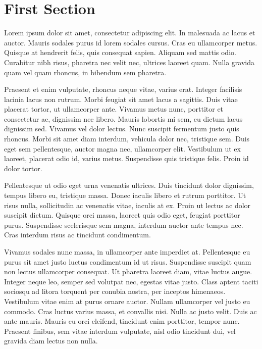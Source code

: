 \documentclass[10pt,
twocolumn,a4paper]{article}
\begin{document}
\section{First Section}


Lorem ipsum dolor sit amet, consectetur adipiscing elit. In malesuada ac lacus et auctor. Mauris sodales purus id lorem sodales cursus. Cras eu ullamcorper metus. Quisque at hendrerit felis, quis consequat sapien. Aliquam sed mattis odio. Curabitur nibh risus, pharetra nec velit nec, ultrices laoreet quam. Nulla gravida quam vel quam rhoncus, in bibendum sem pharetra.

Praesent et enim vulputate, rhoncus neque vitae, varius erat. Integer facilisis lacinia lacus non rutrum. Morbi feugiat sit amet lacus a sagittis. Duis vitae placerat tortor, ut ullamcorper ante. Vivamus metus nunc, porttitor et consectetur ac, dignissim nec libero. Mauris lobortis mi sem, eu dictum lacus dignissim sed. Vivamus vel dolor lectus. Nunc suscipit fermentum justo quis rhoncus. Morbi sit amet diam interdum, vehicula dolor nec, tristique sem. Duis eget sem pellentesque, auctor magna nec, ullamcorper elit. Vestibulum ut ex laoreet, placerat odio id, varius metus. Suspendisse quis tristique felis. Proin id dolor tortor.

Pellentesque ut odio eget urna venenatis ultrices. Duis tincidunt dolor dignissim, tempus libero eu, tristique massa. Donec iaculis libero et rutrum porttitor. Ut risus nulla, sollicitudin ac venenatis vitae, iaculis at ex. Proin ut lectus ac dolor suscipit dictum. Quisque orci massa, laoreet quis odio eget, feugiat porttitor purus. Suspendisse scelerisque sem magna, interdum auctor ante tempus nec. Cras interdum risus ac tincidunt condimentum.

Vivamus sodales nunc massa, in ullamcorper ante imperdiet at. Pellentesque eu purus sit amet justo luctus condimentum id ut risus. Suspendisse suscipit quam non lectus ullamcorper consequat. Ut pharetra laoreet diam, vitae luctus augue. Integer neque leo, semper sed volutpat nec, egestas vitae justo. Class aptent taciti sociosqu ad litora torquent per conubia nostra, per inceptos himenaeos. Vestibulum vitae enim at purus ornare auctor. Nullam ullamcorper vel justo eu commodo. Cras luctus varius massa, et convallis nisi. Nulla ac justo velit. Duis ac ante mauris. Mauris eu orci eleifend, tincidunt enim porttitor, tempor nunc. Praesent finibus, sem vitae interdum vulputate, nisl odio tincidunt dui, vel gravida diam lectus non nulla.
\end{document}
